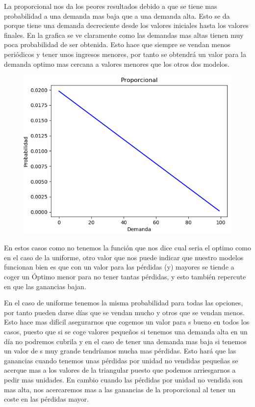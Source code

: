 \documentclass[]{article}
\begin{document}
La proporcional nos da los peores resultados debido a que se tiene mas probabilidad a una demanda mas baja que a una demanda alta. Esto se da porque tiene una demanda decreciente desde los valores iniciales hasta los valores finales. En la grafica se ve claramente como las demandas mas altas tienen muy poca probabilidad de ser obtenida. Esto hace que siempre se vendan menos periódicos y tener unos ingresos menores, por tanto se obtendrá un valor para la demanda optimo mas cercana a valores menores que los otros dos modelos.
\begin{figure}[H]
	\centering
	\includegraphics[width=1\linewidth]{img/screenshot001}
	\caption{}
	\label{fig:screenshot001}
\end{figure}
En estos casos como no tenemos la función que nos dice cual seria el optimo como en el caso de la uniforme, otro valor que nos puede indicar que nuestro modelos funcionan bien es que con un valor para las pérdidas (y) mayores se tiende a coger un Óptimo menor para no tener tantas pérdidas, y esto también repercute en que las ganancias bajan.
\newline

En el caso de uniforme tenemos la misma probabilidad para todas las opciones, por tanto pueden darse días que se vendan mucho y otros que se vendan menos. Esto hace mas difícil asegurarnos que cogemos un valor para s bueno en todos los casos, puesto que si se coge valores pequeños si tenemos una demanda alta en un día no podremos cubrila y en el caso de tener una demanda mas baja si tenemos un valor de s muy grande tendríamos mucha mas pérdidas. Esto hará que las  ganancias cuando tenemos unas pérdidas por unidad no vendidas pequeñas se acerque mas a los valores de la triangular puesto que podemos arriesgarnos a pedir mas unidades. En cambio cuando las pérdidas por unidad no vendida son mas alta, nos acercaremos mas a las ganancias de la proporcional al tener un coste en las pérdidas mayor.
\end{document}
